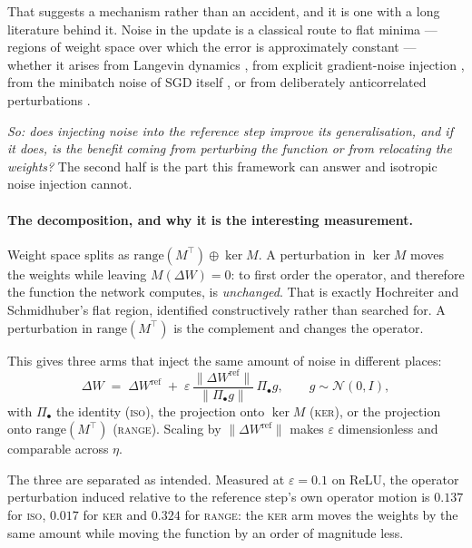 \documentclass{article} %
\theoremstyle{plain}
\theoremstyle{definition}
\theoremstyle{remark}
\begin{document}
That suggests a mechanism rather than an accident, and it is one with a long literature behind it.
Noise in the update is a classical route to flat minima --- regions of weight space over which the
error is approximately constant \citep{hochreiter1997flat} --- whether it arises from Langevin
dynamics \citep{welling2011sgld}, from explicit gradient-noise injection
\citep{neelakantan2015adding}, from the minibatch noise of SGD itself
\citep{smith2020generalization}, or from deliberately anticorrelated perturbations
\citep{orvieto2022anticorrelated}.

\emph{So: does injecting noise into the reference step improve its generalisation, and if it does,
is the benefit coming from perturbing the function or from relocating the weights?} The second half
is the part this framework can answer and isotropic noise injection cannot.

\paragraph{The decomposition, and why it is the interesting measurement.}
Weight space splits as $\mathrm{range}(M^\top) \oplus \ker M$. A perturbation in $\ker M$ moves the
weights while leaving $M(\Delta W) = 0$: to first order the operator, and therefore the function the
network computes, is \emph{unchanged}. That is exactly Hochreiter and Schmidhuber's flat region,
identified constructively rather than searched for. A perturbation in $\mathrm{range}(M^\top)$ is
the complement and changes the operator.

This gives three arms that inject the same amount of noise in different places:
\begin{equation}
  \Delta W \;=\; \Delta W^{\mathrm{ref}} \;+\;
  \varepsilon\,\frac{\|\Delta W^{\mathrm{ref}}\|}{\|\Pi_\bullet g\|}\,\Pi_\bullet g ,
  \qquad g \sim \mathcal N(0, I),
  \label{eq:opnoise}
\end{equation}
with $\Pi_\bullet$ the identity (\textsc{iso}), the projection onto $\ker M$ (\textsc{ker}), or the
projection onto $\mathrm{range}(M^\top)$ (\textsc{range}). Scaling by
$\|\Delta W^{\mathrm{ref}}\|$ makes $\varepsilon$ dimensionless and comparable across $\eta$.

The three are separated as intended. Measured at $\varepsilon = 0.1$ on ReLU, the operator
perturbation induced relative to the reference step's own operator motion is $0.137$ for
\textsc{iso}, $0.017$ for \textsc{ker} and $0.324$ for \textsc{range}: the \textsc{ker} arm moves
the weights by the same amount while moving the function by an order of magnitude less.
\end{document}
